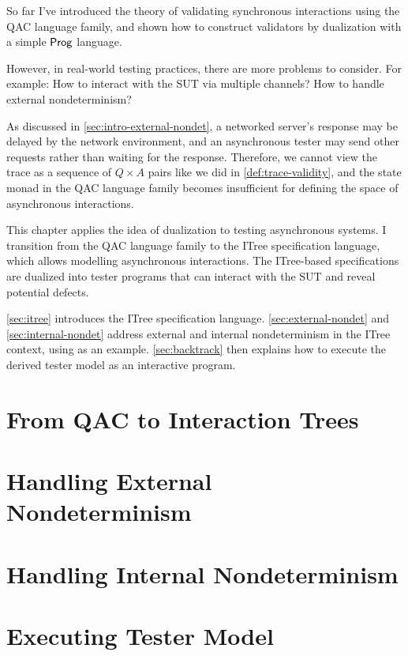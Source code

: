 So far I've introduced the theory of validating synchronous interactions using
the QAC language family, and shown how to construct validators by dualization
with a simple $\mathsf{Prog}$ language.

However, in real-world testing practices, there are more problems to consider.
For example: How to interact with the SUT via multiple channels?  How to handle
external nondeterminism?

As discussed in \autoref{sec:intro-external-nondet}, a networked server's
response may be delayed by the network environment, and an asynchronous tester
may send other requests rather than waiting for the response.  Therefore, we
cannot view the trace as a sequence of $Q\times A$ pairs like we did
in \autoref{def:trace-validity}, and the state monad in the QAC language family
becomes insufficient for defining the space of asynchronous interactions.

This chapter applies the idea of dualization to testing asynchronous systems.  I
transition from the QAC language family to the ITree specification language,
which allows modelling asynchronous interactions.  The ITree-based
specifications are dualized into tester programs that can interact with the SUT
and reveal potential defects.

\autoref{sec:itree} introduces the ITree specification language.
\autoref{sec:external-nondet} and \autoref{sec:internal-nondet} address external
and internal nondeterminism in the ITree context, using \http as an
example.  \autoref{sec:backtrack} then explains how to execute the derived
tester model as an interactive program.

\section{From QAC to Interaction Trees}
\label{sec:itree}


\section{Handling External Nondeterminism}
\label{sec:external-nondet}


\section{Handling Internal Nondeterminism}
\label{sec:internal-nondet}


\section{Executing Tester Model}
\label{sec:backtrack}

